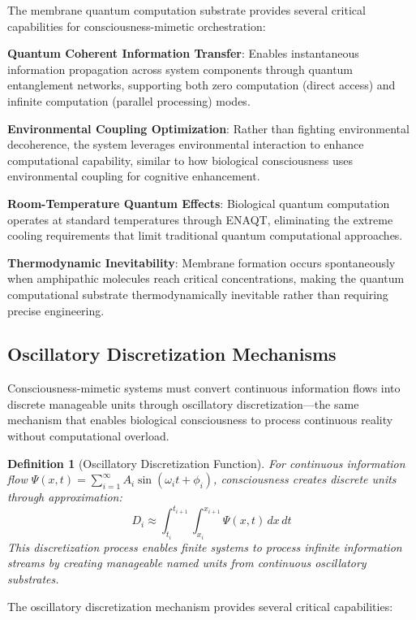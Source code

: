 \documentclass[12pt,a4paper]{article}
\newtheorem{definition}[theorem]{Definition}
\begin{document}
The membrane quantum computation substrate provides several critical capabilities for consciousness-mimetic orchestration:

\textbf{Quantum Coherent Information Transfer}: Enables instantaneous information propagation across system components through quantum entanglement networks, supporting both zero computation (direct access) and infinite computation (parallel processing) modes.

\textbf{Environmental Coupling Optimization}: Rather than fighting environmental decoherence, the system leverages environmental interaction to enhance computational capability, similar to how biological consciousness uses environmental coupling for cognitive enhancement.

\textbf{Room-Temperature Quantum Effects}: Biological quantum computation operates at standard temperatures through ENAQT, eliminating the extreme cooling requirements that limit traditional quantum computational approaches.

\textbf{Thermodynamic Inevitability}: Membrane formation occurs spontaneously when amphipathic molecules reach critical concentrations, making the quantum computational substrate thermodynamically inevitable rather than requiring precise engineering.

\subsection{Oscillatory Discretization Mechanisms}

Consciousness-mimetic systems must convert continuous information flows into discrete manageable units through oscillatory discretization—the same mechanism that enables biological consciousness to process continuous reality without computational overload.

\begin{definition}[Oscillatory Discretization Function]
For continuous information flow $\Psi(x,t) = \sum_{i=1}^{\infty} A_i \sin(\omega_i t + \phi_i)$, consciousness creates discrete units through approximation:
$$D_i \approx \int_{t_i}^{t_{i+1}} \int_{x_i}^{x_{i+1}} \Psi(x,t) \, dx \, dt$$
This discretization process enables finite systems to process infinite information streams by creating manageable named units from continuous oscillatory substrates.
\end{definition}

The oscillatory discretization mechanism provides several critical capabilities:
\end{document}
